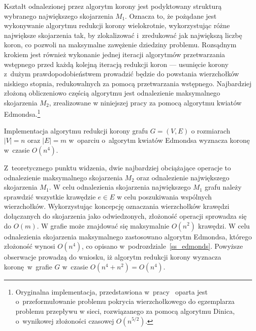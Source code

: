 \par{
  Kształt odnalezionej przez algorytm korony jest podyktowany strukturą wybranego największego skojarzenia $M_1$.
  Oznacza to, że pożądane jest wykonywanie algorytmu redukcji korony wielokrotnie, wykorzystując różne największe skojarzenia tak, by zlokalizować i~zredukować jak największą liczbę koron, co pozwoli na maksymalne zawężenie dziedziny problemu.
  Rozsądnym krokiem jest również wykonanie jednej iteracji algorytmów przetwarzania wstępnego przed każdą kolejną iteracją redukcji koron --- usunięcie korony z~dużym prawdopodobieństwem prowadzić będzie do powstania wierzchołków niskiego stopnia, redukowalnych za pomocą przetwarzania wstępnego.
  Najbardziej złożoną obliczeniowo częścią algorytmu jest odnalezienie maksymalnego skojarzenia $M_2$, zrealizowane w niniejszej pracy za pomocą algorytmu kwiatów Edmondsa.\footnote{
    Oryginalna implementacja, przedstawiona w~pracy~\cite{KernelizationAlgorithms04} oparta jest o~przeformułowanie problemu pokrycia wierzchołkowego do egzemplarza problemu przepływu w sieci, rozwiązanego za pomocą algorytmu Dinica, o~wynikowej złożoności czasowej $O(n^{5/2})$.
  }
}
\begin{theorem}
  Implementacja algorytmu redukcji korony grafu $G=(V,E)$ o rozmiarach $|V|=n$ oraz $|E|=m$ w~oparciu o~algorytm kwiatów Edmondsa wyznacza koronę w~czasie $O(n^{4})$.
\end{theorem}
\begin{bproof}
  Z~teoretycznego punktu widzenia, dwie najbardziej obciążające operacje to odnalezienie maksymalnego skojarzenia $M_2$ oraz odnalezienie największego skojarzenia $M_1$.
  W celu odnalezienia skojarzenia największego $M_1$ grafu należy sprawdzić wszystkie krawędzie $e\in E$ w celu poszukiwania wspólnych wierzchołków.
  Wykorzystując koncepcję oznaczania wierzchołków krawędzi dołączanych do skojarzenia jako odwiedzonych, złożoność operacji sprowadza się do $O(m)$.
  W grafie może znajdować się maksymalnie $O(n^{2})$ krawędzi.
  W celu odnalezienia skojarzenia maksymalnego zastosowano algorytm Edmondsa, którego złożoność wynosi $O(n^{4})$, co opisano w~podrozdziale~\ref{ss_edmonds}.
  Powyższe obserwacje prowadzą do wniosku, iż algorytm redukcji korony wyznacza koronę w~grafie $G$ w~czasie $O(n^{4} + n^{2})=O(n^{4})$.
\end{bproof}
